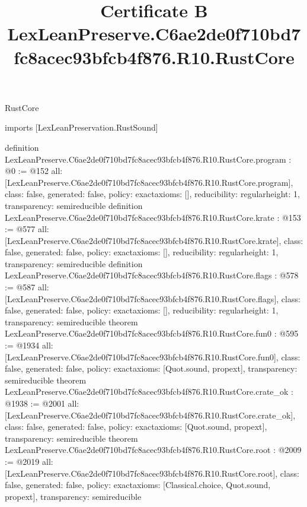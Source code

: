 \begin{lexlean}{RustCore}
\title{Certificate B LexLeanPreserve.C6ae2de0f710bd7fc8acec93bfcb4f876.R10.RustCore}
\begin{coremodule}
imports [LexLeanPreservation.RustSound]

definition LexLeanPreserve.C6ae2de0f710bd7fc8acec93bfcb4f876.R10.RustCore.program : @0 := @152 {
  all: [LexLeanPreserve.C6ae2de0f710bd7fc8acec93bfcb4f876.R10.RustCore.program],
  class: false,
  generated: false,
  policy: exact{axioms: []},
  reducibility: regular{height: 1},
  transparency: semireducible
}
definition LexLeanPreserve.C6ae2de0f710bd7fc8acec93bfcb4f876.R10.RustCore.krate : @153 := @577 {
  all: [LexLeanPreserve.C6ae2de0f710bd7fc8acec93bfcb4f876.R10.RustCore.krate],
  class: false,
  generated: false,
  policy: exact{axioms: []},
  reducibility: regular{height: 1},
  transparency: semireducible
}
definition LexLeanPreserve.C6ae2de0f710bd7fc8acec93bfcb4f876.R10.RustCore.flags : @578 := @587 {
  all: [LexLeanPreserve.C6ae2de0f710bd7fc8acec93bfcb4f876.R10.RustCore.flags],
  class: false,
  generated: false,
  policy: exact{axioms: []},
  reducibility: regular{height: 1},
  transparency: semireducible
}
theorem LexLeanPreserve.C6ae2de0f710bd7fc8acec93bfcb4f876.R10.RustCore.fun0 : @595 := @1934 {
  all: [LexLeanPreserve.C6ae2de0f710bd7fc8acec93bfcb4f876.R10.RustCore.fun0],
  class: false,
  generated: false,
  policy: exact{axioms: [Quot.sound, propext]},
  transparency: semireducible
}
theorem LexLeanPreserve.C6ae2de0f710bd7fc8acec93bfcb4f876.R10.RustCore.crate_ok : @1938 := @2001 {
  all: [LexLeanPreserve.C6ae2de0f710bd7fc8acec93bfcb4f876.R10.RustCore.crate_ok],
  class: false,
  generated: false,
  policy: exact{axioms: [Quot.sound, propext]},
  transparency: semireducible
}
theorem LexLeanPreserve.C6ae2de0f710bd7fc8acec93bfcb4f876.R10.RustCore.root : @2009 := @2019 {
  all: [LexLeanPreserve.C6ae2de0f710bd7fc8acec93bfcb4f876.R10.RustCore.root],
  class: false,
  generated: false,
  policy: exact{axioms: [Classical.choice, Quot.sound, propext]},
  transparency: semireducible
}


\end{coremodule}
\end{lexlean}
